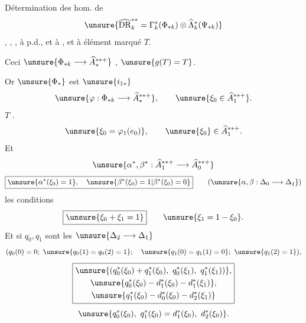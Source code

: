 Détermination des hom. 
 de
\[
\unsure{\widehat{\mathrm{DR}}^{**}_k=\Gamma_k^*(\Phi_{*k})\otimes\widehat\Lambda_k^*(\Psi_{*k})}
\]
    ,
,  ,
à p.d., et à , et à élément marqué $T$.

Ceci  
$\unsure{\Phi_{*k}\longrightarrow\widehat A_*^{**+}}$ 
 ,  
  $\unsure{g(T)=T}$.

Or $\unsure{\Phi_*}$ est    
 $\unsure{i_{1*}}$  
\[
\unsure{\varphi:\Phi_{*k}\longrightarrow\widehat A_*^{**+}},\qquad
\unsure{\xi_0\in\widehat A_1^{**+}}.
\]
  
 $T$ .
\[
\unsure{\xi_0=\varphi_1(e_0)},\qquad
\unsure{\xi_0}\in\widehat A_1^{**+}.
\]
Et 
\[
\unsure{\alpha^*,\beta^*: \widehat A_1^{**+}\longrightarrow\widehat A_0^{**+}}
\]
\[
\boxed{\unsure{\alpha^*(\xi_0)=1},\quad\unsure{\beta^*(\xi_0)=1|\beta^*(\xi_0)=0}}
\qquad (\unsure{\alpha,\beta:\Delta_0\longrightarrow\Delta_1})
\]
les conditions   
 
\[
\boxed{\unsure{\xi_0+\xi_1=1}}\qquad
\unsure{\xi_1=1-\xi_0}.
\]
Et si $q_0,q_1$ sont les  $\unsure{\Delta_2\longrightarrow\Delta_1}$
\[
( q_0(0)=0;\ \unsure{q_0(1)=q_0(2)=1};\quad
\unsure{q_1(0)=q_1(1)=0};\ \unsure{q_1(2)=1}),
\]
\[
\boxed{\begin{gathered}
\unsure{(q_0^*(\xi_0)+q_1^*(\xi_0),\ q_0^*(\xi_1),\ q_1^*(\xi_1))},\\
\unsure{q_0^*(\xi_0)-d_1^*(\xi_0)-d_1^*(\xi_1)},\\
\unsure{q_1^*(\xi_0)-d_0^*(\xi_0)-d_2^*(\xi_1)}
\end{gathered}}
\]
\[
\unsure{q_0^*(\xi_0),\ q_1^*(\xi_0)=d_1^*(\xi_0),\ d_2^*(\xi_0)}.
\]
